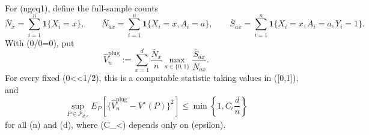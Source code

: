 For (ngeq1), define the full-sample counts
\[
 \overline N_x=\sum_{i=1}^n\mathbf 1\{X_i=x\},\qquad
 \overline N_{ax}=\sum_{i=1}^n\mathbf 1\{X_i=x,A_i=a\},\qquad
 \overline S_{ax}=\sum_{i=1}^n\mathbf 1\{X_i=x,A_i=a,Y_i=1\}.
\]
With (0/0=0), put
\[
 \widehat V_n^{\mathrm{plug}}
 :=\sum_{x=1}^d\frac{\overline N_x}{n}
       \max_{a\in\{0,1\}}\frac{\overline S_{ax}}{\overline N_{ax}}.
\]
For every fixed (0<\epsilon<1/2), this is a computable statistic taking values in ([0,1]), and
\[
 \sup_{P\in\mathcal P_{d,\epsilon}}
 E_P\!\left[
   \{\widehat V_n^{\mathrm{plug}}-V^\star(P)\}^2
 \right]
 \leq \min\left\{1,C_\epsilon\frac d n\right\}
\]
for all (n) and (d), where (C_\epsilon<\infty) depends only on (epsilon).